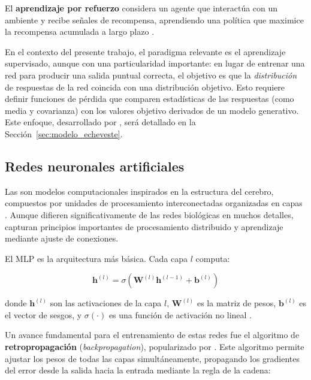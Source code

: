 El \textbf{aprendizaje por refuerzo} considera un agente que interactúa con un ambiente y recibe señales de recompensa, aprendiendo una política que maximice la recompensa acumulada a largo plazo \citep{bishop2006pattern}.

En el contexto del presente trabajo, el paradigma relevante es el aprendizaje supervisado, aunque con una particularidad importante: en lugar de entrenar una red para producir una salida puntual correcta, el objetivo es que la \textit{distribución} de respuestas de la red coincida con una distribución objetivo. Esto requiere definir funciones de pérdida que comparen estadísticas de las respuestas (como media y covarianza) con los valores objetivo derivados de un modelo generativo. Este enfoque, desarrollado por \cite{echeveste2020cortical}, será detallado en la Sección~\ref{sec:modelo_echeveste}.

\subsection{Redes neuronales artificiales}
\label{subsec:redes_artificiales}

Las  son modelos computacionales inspirados en la estructura del cerebro, compuestos por unidades de procesamiento interconectadas organizadas en capas \citep{heaton2018ian}. Aunque difieren significativamente de las redes biológicas en muchos detalles, capturan principios importantes de procesamiento distribuido y aprendizaje mediante ajuste de conexiones.

El \acrfull{MLP} es la arquitectura más básica. Cada capa $l$ computa:

\begin{equation}
\mathbf{h}^{(l)} = \sigma(\mathbf{W}^{(l)}\mathbf{h}^{(l-1)} + \mathbf{b}^{(l)})
\label{eq:mlp_layer}
\end{equation}

donde $\mathbf{h}^{(l)}$ son las activaciones de la capa $l$, $\mathbf{W}^{(l)}$ es la matriz de pesos, $\mathbf{b}^{(l)}$ es el vector de sesgos, y $\sigma(\cdot)$ es una función de activación no lineal \citep{heaton2018ian}.

Un avance fundamental para el entrenamiento de estas redes fue el algoritmo de \textbf{retropropagación} (\textit{backpropagation}), popularizado por \citet{rumelhart1986learning}. Este algoritmo permite ajustar los pesos de todas las capas simultáneamente, propagando los gradientes del error desde la salida hacia la entrada mediante la regla de la cadena:

